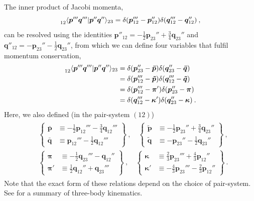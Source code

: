 \documentclass[aps,prc,showpacs,twocolumn,floatfix,nobibnotes,nofootinbib,amsmath,amssymb,longbibliography]{revtex4-2}
\begin{document}
The inner product of Jacobi momenta,
\begin{equation}
	\prescript{}{12}{\langle} \bm{p}'''\bm{q}'''|\bm{p}''\bm{q}''\rangle_{23} = \delta(\bm{p}'''_{12}-\bm{p}''_{12})\delta(\bm{q}'''_{12}-\bm{q}''_{12}) \:,
\end{equation}
can be resolved using the identities $\bm{p}''_{12} =
-\frac{1}{2}\bm{p}_{23}''+\frac{3}{4}\bm{q}_{23}''$ and $\bm{q}''_{12}
= -\bm{p}_{23}''-\frac{1}{2}\bm{q}_{23}''$, from which we can define
four variables that fulfil momentum conservation,
\begin{align}
	\begin{split}
	\prescript{}{12}{\langle} \bm{p}'''\bm{q}'''|\bm{p}''\bm{q}''\rangle_{23}
	&= \delta(\bm{p}_{23}''-\bm{\bar{p}})\delta(\bm{q}_{23}''-\bm{\bar{q}}) \\
	&= \delta(\bm{p}_{12}'''-\bm{\tilde{p}})\delta(\bm{q}_{12}'''-\bm{\tilde{q}}) \\
	&= \delta(\bm{p}_{12}'''-\bm{\pi}')\delta(\bm{p}_{23}''-\bm{\pi}) \\
	&= \delta(\bm{q}_{12}'''-\bm{\kappa}')\delta(\bm{q}_{23}''-\bm{\kappa}) \:.
	\end{split}
	\label{eq | permutation matrix dirac delta choice}
\end{align}
Here, we also defined (in the pair-system $(12)$)
\begin{align}
	\begin{split}
	&\left.\begin{cases}
	\bm{\bar{p}}  &\equiv -\frac{1}{2}\bm{p}_{12}''' - \frac{3}{4}\bm{q}_{12}''' \\
	\bm{\bar{q}}  &\equiv \bm{p}_{12}''' - \frac{1}{2}\bm{q}_{12}'''
	\end{cases}\right\}
	\:,\quad
	\left.\begin{cases}
	\bm{\tilde{p}}  &\equiv -\frac{1}{2}\bm{p}_{23}'' + \frac{3}{4}\bm{q}_{23}'' \\
	\bm{\tilde{q}}  &\equiv -\bm{p}_{23}'' - \frac{1}{2}\bm{q}_{23}''
	\end{cases}\right\} \:,
	\\	
	&\left.\begin{cases}
	\bm{\pi}  &\equiv  -\frac{1}{2}\bm{q}_{23}''' - \bm{q}_{12}''\\
	\bm{\pi}' &\equiv \frac{1}{2}\bm{q}_{12}'' + \bm{q}_{23}'''
	\end{cases}\right\}
	\:,\quad
	\left.\begin{cases}
	\bm{\kappa}  &\equiv  \frac{2}{3}\bm{p}_{23}''' + \frac{4}{3}\bm{p}_{12}''\\
	\bm{\kappa}' &\equiv -\frac{4}{3}\bm{p}_{23}''' - \frac{2}{3}\bm{p}_{12}''
	\end{cases}\right\}\:.
	\end{split}
	\label{eq | pi bar tilde momenta}
\end{align}
Note that the exact form of these relations depend on the choice of
pair-system. See \cite{Hebeler:2020ocj} for a summary of three-body
kinematics.
\end{document}
